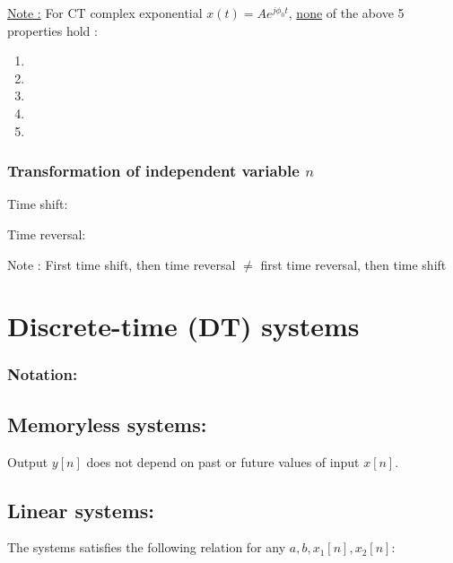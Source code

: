 \documentclass[10pt,a4paper,report]{report}       %
\begin{document}
\underline{Note :} For CT complex exponential $x(t)=Ae^{j\phi_0t}$, \underline{none} of the above 5 properties hold :
\begin{enumerate}
  \item 
  \item
  \item
  \item
  \item
\end{enumerate}
\vspace{1cm}

\subsubsection{Transformation of independent variable $n$}
Time shift:
\vspace{4.5cm}

Time reversal:
\vspace{4.5cm}

Note : First time shift, then time reversal $\neq$ first time reversal, then time shift\\
\vspace{1cm}


\section{Discrete-time (DT) systems}

\subsubsection{Notation:} \vspace{3cm}

\subsection{Memoryless systems:} 
Output $y[n]$ does not depend on past or future values of input $x[n]$. \\
\ex
\vspace{3cm}

\subsection{Linear systems:} 
The systems satisfies the following relation for any $a, b, x_1[n], x_2[n]$: 
\vspace{4cm}\\
\vspace{3cm}
\end{document}
